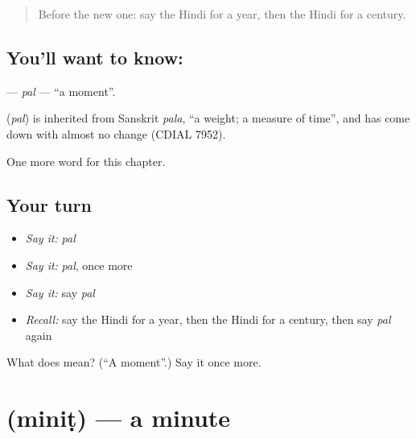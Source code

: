 \label{lesson:HI-C191-pal}



\begin{quote}
Before the new one: say the Hindi for a year, then the Hindi for a century.
\end{quote}

\subsection*{You'll want to know: }
\textbf{} — \emph{pal} — \textquotedblleft{}a moment\textquotedblright{}.

\begin{cousinweb}
\textbf{} (\emph{pal}) is inherited from Sanskrit \emph{pala}, \textquotedblleft{}a weight; a measure of time\textquotedblright{}, and has come down with almost no change (CDIAL 7952).
\end{cousinweb}

\begin{grammarlens}[title={What you've built}]
One more word for this chapter.
\end{grammarlens}

\subsection*{Your turn}
\begin{itemize}
\raggedright
  \item \emph{Say it:} \emph{pal}
  \item \emph{Say it:} \emph{pal}, once more
  \item \emph{Say it:} say \emph{pal}
  \item \emph{Recall:} say the Hindi for a year, then the Hindi for a century, then say \emph{pal} again
\end{itemize}

\begin{tcolorbox}[breakable,colback=teal!4,colframe=teal!35!black,title={Before you move on}]
What does  mean? (\textquotedblleft{}A moment\textquotedblright{}.) Say it once more.
\end{tcolorbox}
\section[\texorpdfstring{\hi{मिनट} (miniṭ)}{मिनट (miniṭ)}]{ (miniṭ) — a minute}

\label{lesson:HI-C191-minit}



